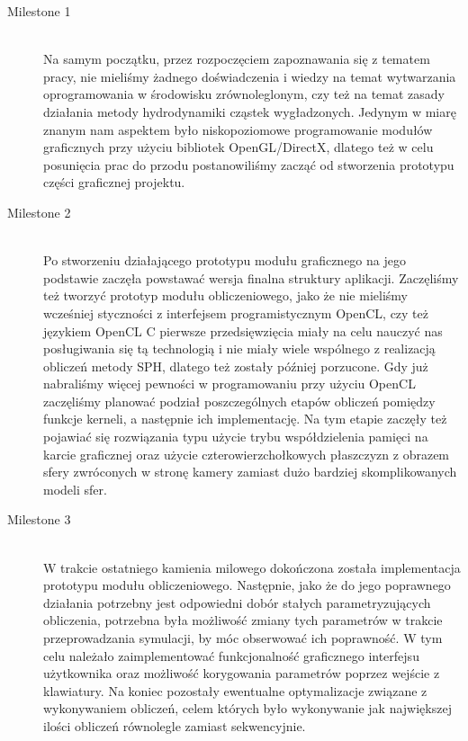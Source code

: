\documentclass[polish, 12pt]{aghthesis}
\begin{document}
	\begin{description}
	
  		\item[Milestone 1] \hfill \\ Na samym początku, przez rozpoczęciem zapoznawania się z tematem pracy, nie mieliśmy żadnego doświadczenia i wiedzy na temat wytwarzania oprogramowania w środowisku zrównoleglonym, czy też na temat zasady działania metody hydrodynamiki cząstek wygładzonych. Jedynym w miarę znanym nam aspektem było niskopoziomowe programowanie modułów graficznych przy użyciu bibliotek OpenGL/DirectX, dlatego też w celu posunięcia prac do przodu postanowiliśmy zacząć od stworzenia prototypu części graficznej projektu.
  		
  		\item[Milestone 2] \hfill \\ Po stworzeniu działającego prototypu modułu graficznego na jego podstawie zaczęła powstawać wersja finalna struktury aplikacji. Zaczęliśmy też tworzyć prototyp modułu obliczeniowego, jako że nie mieliśmy wcześniej styczności z interfejsem programistycznym OpenCL, czy też językiem OpenCL C pierwsze przedsięwzięcia miały na celu nauczyć nas posługiwania się tą technologią i nie miały wiele wspólnego z realizacją obliczeń metody SPH, dlatego też zostały później porzucone. Gdy już nabraliśmy więcej pewności w programowaniu przy użyciu OpenCL zaczęliśmy planować podział poszczególnych etapów obliczeń pomiędzy funkcje kerneli, a następnie ich implementację. Na tym etapie zaczęły też pojawiać się rozwiązania typu użycie trybu współdzielenia pamięci na karcie graficznej oraz użycie czterowierzchołkowych płaszczyzn z obrazem sfery zwróconych w stronę kamery zamiast dużo bardziej skomplikowanych modeli sfer.
  		
 		\item[Milestone 3] \hfill \\ W trakcie ostatniego kamienia milowego dokończona została implementacja prototypu modułu obliczeniowego. Następnie, jako że do jego poprawnego działania potrzebny jest odpowiedni dobór stałych parametryzujących obliczenia, potrzebna była możliwość zmiany tych parametrów w trakcie przeprowadzania symulacji, by móc obserwować ich poprawność. W tym celu należało zaimplementować funkcjonalność graficznego interfejsu użytkownika oraz możliwość korygowania parametrów poprzez wejście z klawiatury. Na koniec pozostały ewentualne optymalizacje związane z wykonywaniem obliczeń, celem których było wykonywanie jak największej ilości obliczeń równolegle zamiast sekwencyjnie.
  			
	\end{description}
	
\end{document}
